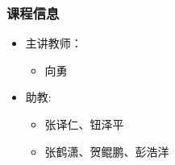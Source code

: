 %
%
\begin{frame}
    \frametitle{课程信息}
    \begin{itemize}
        \item 主讲教师：
        \begin{itemize}
            \item 向勇
        \end{itemize}
        
        \item 助教: 
        \begin{itemize}
            \item 张译仁、钮泽平
            \item 张鹤潇、贺鲲鹏、彭浩洋
        \end{itemize}
    \end{itemize}
\end{frame}

